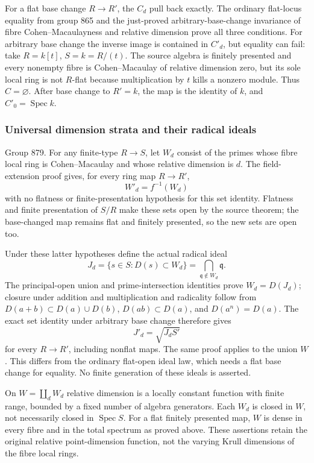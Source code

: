 For a flat base change \(R\to R'\), the \(C_d\) pull back exactly. The ordinary flat-locus equality from group 865 and the just-proved arbitrary-base-change invariance of fibre Cohen--Macaulayness and relative dimension prove all three conditions. For arbitrary base change the inverse image is contained in \(C'_d\), but equality can fail: take \(R=k[t]\), \(S=k=R/(t)\). The source algebra is finitely presented and every nonempty fibre is Cohen--Macaulay of relative dimension zero, but its sole local ring is not \(R\)-flat because multiplication by \(t\) kills a nonzero module. Thus \(C=\varnothing\). After base change to \(R'=k\), the map is the identity of \(k\), and \(C'_0=\operatorname{Spec}k\).

\subsubsection{Universal dimension strata and their radical ideals}\label{algebra-proof-040-universal-dimension-strata-and-their-radical-ideals}

Group 879. For any finite-type \(R\to S\), let \(W_d\) consist of the primes whose fibre local ring is Cohen--Macaulay and whose relative dimension is \(d\). The field-extension proof gives, for every ring map \(R\to R'\), \[
W'_d=f^{-1}(W_d)
\] with no flatness or finite-presentation hypothesis for this set identity. Flatness and finite presentation of \(S/R\) make these sets open by the source theorem; the base-changed map remains flat and finitely presented, so the new sets are open too.

Under these latter hypotheses define the actual radical ideal \[
J_d=\{s\in S:D(s)\subset W_d\}
    =\bigcap_{\mathfrak q\notin W_d}\mathfrak q .
\] The principal-open union and prime-intersection identities prove \(W_d=D(J_d)\); closure under addition and multiplication and radicality follow from \(D(a+b)\subset D(a)\cup D(b)\), \(D(ab)\subset D(a)\), and \(D(a^n)=D(a)\). The exact set identity under arbitrary base change therefore gives \[
J'_d=\sqrt{J_d S'}
\] for every \(R\to R'\), including nonflat maps. The same proof applies to the union \(W\). This differs from the ordinary flat-open ideal law, which needs a flat base change for equality. No finite generation of these ideals is asserted.

On \(W=\coprod_d W_d\) relative dimension is a locally constant function with finite range, bounded by a fixed number of algebra generators. Each \(W_d\) is closed in \(W\), not necessarily closed in \(\operatorname{Spec}S\). For a flat finitely presented map, \(W\) is dense in every fibre and in the total spectrum as proved above. These assertions retain the original relative point-dimension function, not the varying Krull dimensions of the fibre local rings.

